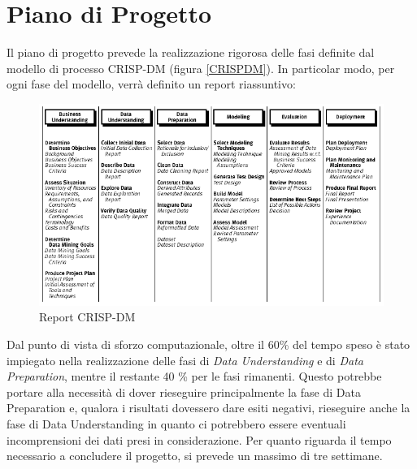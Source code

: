 \section{Piano di Progetto}
Il piano di progetto prevede la realizzazione rigorosa delle fasi definite dal modello di processo CRISP-DM (figura \ref{CRISPDM}).
In particolar modo, per ogni fase del modello, verrà definito un report riassuntivo: 
\begin{figure}[hbtp]
	\centering
	\includegraphics[width=1\textwidth]{./images/Metodologia_CRISP_DM.png}
	\caption{Report CRISP-DM}
	\label{Report_CRISPDM}
\end{figure}
Dal punto di vista di sforzo computazionale, oltre il 60\% del tempo speso è stato impiegato nella realizzazione delle fasi di \textit{Data Understanding} e di \textit{Data Preparation}, mentre il restante 40 \% per le fasi rimanenti.
Questo potrebbe portare alla necessità di dover rieseguire principalmente la fase di Data Preparation e, qualora i risultati dovessero dare esiti negativi, rieseguire anche la fase di Data Understanding in quanto ci potrebbero essere eventuali incomprensioni dei dati presi in considerazione.
Per quanto riguarda il tempo necessario a concludere il progetto, si prevede un massimo di tre settimane.